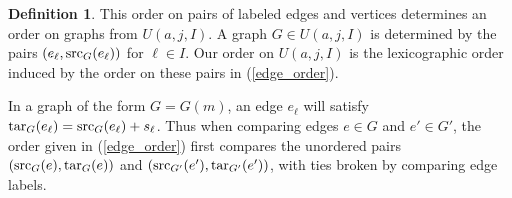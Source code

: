 \documentclass{amsproc}
\theoremstyle{definition}
\newtheorem{definition}[theorem]{Definition}
\theoremstyle{remark}
\numberwithin{equation}{section}
\newcommand{\src}{{\rm src}}
\newcommand{\tar}{{\rm tar}}
\begin{document}
\begin{definition}
This order on pairs of labeled edges and vertices determines an order on graphs from $U(a,j,I)$. A graph $G\in U(a,j,I)$ is determined by the pairs $(e_\ell,\src_G(e_\ell))$ for $\ell\in I$. Our order on $U(a,j,I)$ is the lexicographic order induced by the order on these pairs in (\ref{edge_order}).
\end{definition}

In a graph of the form $G=G(m)$, an edge $e_\ell$ will satisfy $\tar_G(e_\ell)=\src_G(e_\ell)+s_\ell$. Thus when comparing edges $e\in G$ and $e'\in G'$, the order given in (\ref{edge_order}) first compares the unordered pairs $(\src_G(e),\tar_G(e))$ and $(\src_{G'}(e'),\tar_{G'}(e'))$, with ties broken by comparing edge labels.
\end{document}
